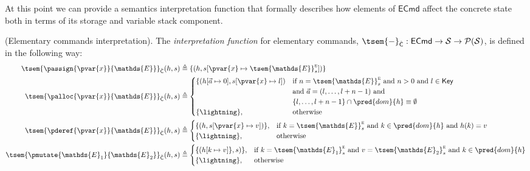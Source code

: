At this point we can provide a semantics interpretation function that formally describes how elements of $\mathsf{ECmd}$ affect the concrete state both in terms of its storage and variable stack component.
\begin{defn}
	(Elementary commands interpretation).
	\label{ecmdint} The \emph{interpretation function} for elementary commands, $\tsem{-}_{\hat{\mathsf{C}}} : \mathsf{ECmd} \rightarrow \mathcal{S} \rightarrow \mathcal{P}(\mathcal{S})$, is defined in the following way:
	\begin{align*}
		\tsem{\passign{\pvar{x}}{\mathds{E}}}_{\hat{\mathsf{C}}}(h, s) &\triangleq \{ (h, s[\pvar{x} \mapsto \tsem{\mathds{E}}_s^\textsc{e}]) \}
		\\
		\tsem{\palloc{\pvar{x}}{\mathds{E}}}_{\hat{\mathsf{C}}}(h, s) &\triangleq
			\begin{cases}
				\{ (h[\vec{a} \mapsto 0], s[\pvar{x} \mapsto l])
				&
				\text{if } n = \tsem{\mathds{E}}_s^\textsc{e} \text{ and } n > 0 \text{ and } l \in \mathsf{Key}\\ & \text{and } \vec{a} = (l, \ldots, l + n - 1) \text{ and } \\
				& \{ l, \ldots, l + n - 1 \} \cap \pred{dom}{h} \equiv \emptyset \\
				\{ \lightning \}, & \text{otherwise}
			\end{cases}
		\\
		\tsem{\pderef{\pvar{x}}{\mathds{E}}}_{\hat{\mathsf{C}}}(h, s) &\triangleq
			\begin{cases}
				\{ (h, s[\pvar{x} \mapsto v]) \}, & \text{if } k = \tsem{\mathds{E}}_s^\textsc{e} \text{ and } k \in \pred{dom}{h} \text{ and } h(k) = v \\
				\{ \lightning \}, & \text{otherwise}
			\end{cases}
		\\
		\tsem{\pmutate{\mathds{E}_1}{\mathds{E}_2}}_{\hat{\mathsf{C}}}(h, s) &\triangleq
		\begin{cases}
			\{ (h[k \mapsto v] \}, s) \}, & \text{if } k = \tsem{\mathds{E}_1}_s^\textsc{e} \text{ and } v = \tsem{\mathds{E}_2}_s^\textsc{e} \text{ and } k \in \pred{dom}{h} \\
			\{ \lightning \}, & \text{otherwise}
		\end{cases}
	\end{align*}
\end{defn}
